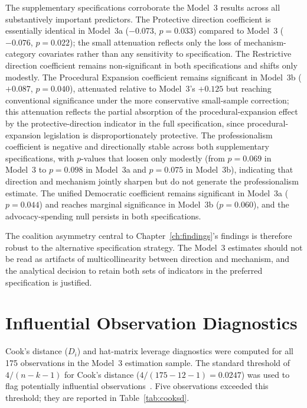 \documentclass[12pt]{report}
\begin{document}
The supplementary specifications corroborate the Model~3 results across all
substantively important predictors. The Protective direction coefficient is essentially
identical in Model~3a ($-0.073$, $p = 0.033$) compared to Model~3 ($-0.076$,
$p = 0.022$); the small attenuation reflects only the loss of mechanism-category
covariates rather than any sensitivity to specification. The Restrictive direction
coefficient remains non-significant in both specifications and shifts only modestly.
The Procedural Expansion coefficient remains significant in Model~3b ($+0.087$,
$p = 0.040$), attenuated relative to Model~3's $+0.125$ but reaching conventional
significance under the more conservative small-sample correction; this attenuation
reflects the partial absorption of the procedural-expansion effect by the
protective-direction indicator in the full specification, since procedural-expansion
legislation is disproportionately protective. The professionalism coefficient is
negative and directionally stable across both supplementary specifications, with
$p$-values that loosen only modestly (from $p = 0.069$ in Model~3 to $p = 0.098$ in
Model~3a and $p = 0.075$ in Model~3b), indicating that direction and mechanism jointly
sharpen but do not generate the professionalism estimate. The unified Democratic
coefficient remains significant in Model~3a ($p = 0.044$) and reaches marginal
significance in Model~3b ($p = 0.060$), and the advocacy-spending null persists in both
specifications.

The coalition asymmetry central to Chapter~\ref{ch:findings}'s findings is therefore
robust to the alternative specification strategy. The Model~3 estimates should not be
read as artifacts of multicollinearity between direction and mechanism, and the
analytical decision to retain both sets of indicators in the preferred specification
is justified.

\section{Influential Observation Diagnostics}
\label{app:C.3}

Cook's distance ($D_i$) and hat-matrix leverage diagnostics were computed for all 175
observations in the Model~3 estimation sample. The standard threshold of $4/(n-k-1)$
for Cook's distance ($4/(175-12-1) = 0.0247$) was used to flag potentially influential
observations~\parencite{cook1977}. Five observations exceeded this threshold; they are
reported in Table~\ref{tab:cooksd}.
\end{document}
